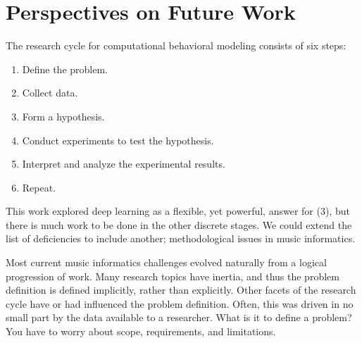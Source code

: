 \section{Perspectives on Future Work}
\label{sec:future}



The research cycle for computational behavioral modeling consists of six steps:


\begin{enumerate}
\item Define the problem.
\item Collect data.
\item Form a hypothesis.
\item Conduct experiments to test the hypothesis.
\item Interpret and analyze the experimental results.
\item Repeat.
\end{enumerate}

This work explored deep learning as a flexible, yet powerful, answer for (3), but there is much work to be done in the other discrete stages.
We could extend the list of deficiencies to include another; methodological issues in music informatics.

Most current music informatics challenges evolved naturally from a logical progression of work.
Many research topics have inertia, and thus the problem definition is defined implicitly, rather than explicitly.
Other facets of the research cycle have or had influenced the problem definition.
Often, this was driven in no small part by the data available to a researcher.
What is it to define a problem?
You have to worry about scope, requirements, and limitations.

